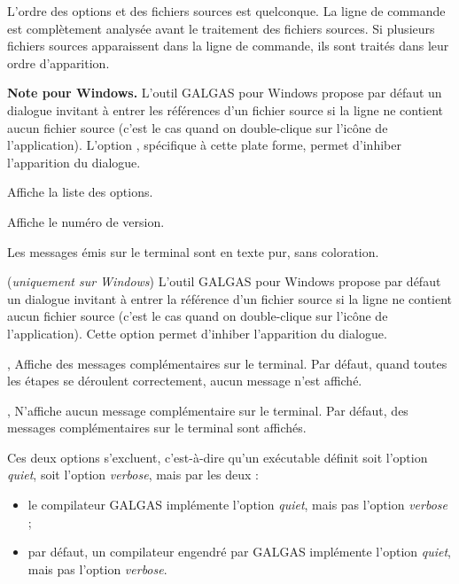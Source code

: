L’ordre des options et des fichiers sources est quelconque. La ligne de commande est complètement analysée avant le traitement des fichiers sources. Si plusieurs fichiers sources apparaissent dans la ligne de commande, ils sont traités dans leur ordre d’apparition.

{\bf Note pour Windows.} L’outil GALGAS pour Windows propose par défaut un dialogue invitant à entrer les références d’un fichier source si la ligne ne contient aucun fichier source (c’est le cas quand on double-clique sur l’icône de l’application). L'option , spécifique à cette plate forme, permet d'inhiber l’apparition du dialogue.


 Affiche la liste des options.

 Affiche le numéro de version.

 Les messages émis sur le terminal sont en texte pur, sans coloration.

 (\emph{uniquement sur Windows}) L’outil GALGAS pour Windows propose par défaut un dialogue invitant à entrer la référence d’un fichier source si la ligne ne contient aucun fichier source (c’est le cas quand on double-clique sur l’icône de l’application). Cette option permet d'inhiber l’apparition du dialogue.




,  Affiche des messages complémentaires sur le terminal. Par défaut, quand toutes les étapes se déroulent correctement, aucun message n’est affiché.

,  N'affiche aucun message complémentaire sur le terminal. Par défaut, des messages complémentaires sur le terminal sont affichés.

Ces deux options s'excluent, c'est-à-dire qu'un exécutable définit soit l'option \emph{quiet}, soit l'option \emph{verbose}, mais par les deux :
\begin{itemize}
  \item le compilateur GALGAS implémente l'option \emph{quiet}, mais pas l'option \emph{verbose} ;
  \item par défaut, un compilateur engendré par GALGAS implémente l'option \emph{quiet}, mais pas l'option \emph{verbose}.
\end{itemize}





